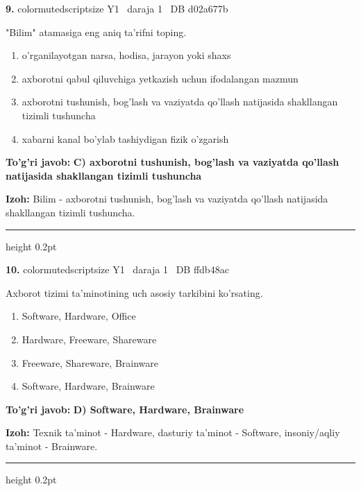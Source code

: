 \documentclass[10pt,a4paper,oneside]{article}
\begin{document}
\noindent\textbf{\color{ink}9.}  {color{muted}scriptsize Y1 \textbullet\ daraja 1 \textbullet\ DB d02a677b}
\par
"Bilim" atamasiga eng aniq ta'rifni toping.
\begin{enumerate}[label=\Alph*),leftmargin=9mm]
\item o'rganilayotgan narsa, hodisa, jarayon yoki shaxs
\item axborotni qabul qiluvchiga yetkazish uchun ifodalangan mazmun
\item axborotni tushunish, bog'lash va vaziyatda qo'llash natijasida shakllangan tizimli tushuncha
\item xabarni kanal bo'ylab tashiydigan fizik o'zgarish
\end{enumerate}
\begin{tcolorbox}[enhanced,breakable,colback=teal!4,colframe=teal!50!black,boxrule=0.5pt,arc=1.1mm,left=3mm,right=3mm,top=1.7mm,bottom=1.7mm,before skip=2mm,after skip=2mm]
\textbf{\color{teal}To'g'ri javob:} \textbf{C) axborotni tushunish, bog'lash va vaziyatda qo'llash natijasida shakllangan tizimli tushuncha}
\par\smallskip
\textbf{Izoh:} Bilim - axborotni tushunish, bog'lash va vaziyatda qo'llash natijasida shakllangan tizimli tushuncha.
\end{tcolorbox}
\vspace{2mm}\hrule height 0.2pt \vspace{3mm}

\noindent\textbf{\color{ink}10.}  {color{muted}scriptsize Y1 \textbullet\ daraja 1 \textbullet\ DB ffdb48ac}
\par
Axborot tizimi ta'minotining uch asosiy tarkibini ko'rsating.
\begin{enumerate}[label=\Alph*),leftmargin=9mm]
\item Software, Hardware, Office
\item Hardware, Freeware, Shareware
\item Freeware, Shareware, Brainware
\item Software, Hardware, Brainware
\end{enumerate}
\begin{tcolorbox}[enhanced,breakable,colback=teal!4,colframe=teal!50!black,boxrule=0.5pt,arc=1.1mm,left=3mm,right=3mm,top=1.7mm,bottom=1.7mm,before skip=2mm,after skip=2mm]
\textbf{\color{teal}To'g'ri javob:} \textbf{D) Software, Hardware, Brainware}
\par\smallskip
\textbf{Izoh:} Texnik ta'minot - Hardware, dasturiy ta'minot - Software, insoniy/aqliy ta'minot - Brainware.
\end{tcolorbox}
\vspace{2mm}\hrule height 0.2pt \vspace{3mm}
\end{document}

